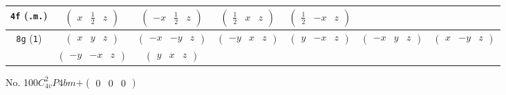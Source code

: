 \documentclass[fleqn,9pt,landscape]{jsarticle}
\begin{document}
\begin{center}
\begin{longtable}{ccccccc}
{\tt 4f} ({\tt .m.}) & $ \begin{pmatrix} x & \frac{1}{2} & z \end{pmatrix} $ & $ \begin{pmatrix} - x & \frac{1}{2} & z \end{pmatrix} $ & $ \begin{pmatrix} \frac{1}{2} & x & z \end{pmatrix} $ & $ \begin{pmatrix} \frac{1}{2} & - x & z \end{pmatrix} $ & $  $ & $  $ \\ \hline
{\tt 8g} ({\tt 1}) & $ \begin{pmatrix} x & y & z \end{pmatrix} $ & $ \begin{pmatrix} - x & - y & z \end{pmatrix} $ & $ \begin{pmatrix} - y & x & z \end{pmatrix} $ & $ \begin{pmatrix} y & - x & z \end{pmatrix} $ & $ \begin{pmatrix} - x & y & z \end{pmatrix} $ & $ \begin{pmatrix} x & - y & z \end{pmatrix} $ \\
& $ \begin{pmatrix} - y & - x & z \end{pmatrix} $ & $ \begin{pmatrix} y & x & z \end{pmatrix} $ & $  $ & $  $ & $  $ & $  $ \\
\end{longtable}
\end{center}
\newpage
No. 100\quad$C_{4v}^{2}$\quad$P4bm$\quad[ tetragonal ]\quad$+\begin{pmatrix} 0 & 0 & 0 \end{pmatrix}$
\end{document}
